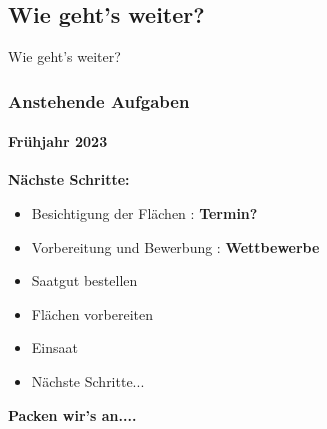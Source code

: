 \documentclass[aspectratio=43]{beamer}
\begin{document}
\subsection[Aufgaben]{Wie geht's weiter?}

\begin{frame}{Wie geht's weiter?}
	\frametitle{Anstehende Aufgaben} 
	\framesubtitle{Frühjahr 2023}

	\textbf{Nächste Schritte:}\\
	\begin{itemize}
		\item 
			Besichtigung der Flächen : 
			\textbf{Termin?} \pause 
		\item 
			Vorbereitung und Bewerbung : 
			\textbf{Wettbewerbe} \pause 
		\item 
			Saatgut bestellen \pause
		\item 
			Flächen vorbereiten \pause
		\item 
			Einsaat \pause
		\item 
			Nächste Schritte...%
	\end{itemize}
	\begin{center}
	\textbf{Packen wir's an....}	
	\end{center}
\end{frame}

\end{document}
